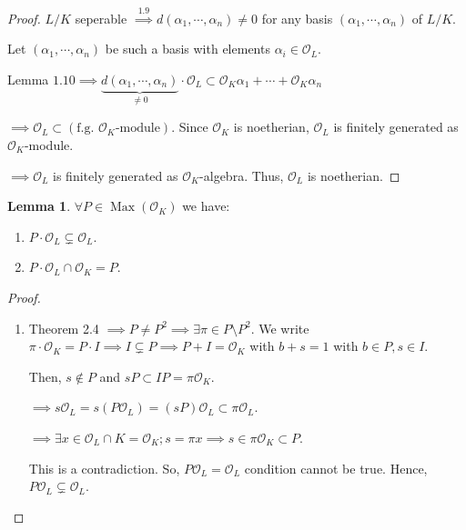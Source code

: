 \documentclass[openany]{amsbook}
\numberwithin{section}{chapter}
\theoremstyle{definition}
\newtheorem{lemma}[theorem]{Lemma}
\begin{document}
\begin{proof}
    \(L / K\) seperable \(\overset{1.9}{\implies}  d(\alpha_1, \cdots , \alpha_n) \neq 0\) for any basis \((\alpha_1, \cdots , \alpha_n)\) of \(L / K\). 

    Let \((\alpha_1, \cdots , \alpha_n)\) be such a basis with elements \(\alpha_i \in \mathcal{O}_L\). 

    Lemma \(1.10 \implies \underbrace{d(\alpha_1, \cdots , \alpha_n) }_{\neq 0} \cdot \mathcal{O}_L \subset \mathcal{O}_K \alpha_1 + \cdots + \mathcal{O}_K \alpha_n\) 

    \(\implies \mathcal{O}_L \subset (\text{f.g. } \mathcal{O}_K \text{-module})\). Since \(\mathcal{O}_K\) is noetherian, \(\mathcal{O}_L\) is finitely generated as \(\mathcal{O}_K\)-module.

    \(\implies \mathcal{O}_L\) is finitely generated as \(\mathcal{O}_K\)-algebra. Thus, \(\mathcal{O}_L\) is noetherian.
\end{proof}

\begin{lemma}
    \(\forall P \in \operatorname{Max}(\mathcal{O}_K)\) we have:

    \begin{enumerate}[label=\roman*)]
        \item \(P \cdot \mathcal{O}_L \subsetneq \mathcal{O}_L\).
        \item \(P \cdot \mathcal{O}_L \cap \mathcal{O}_K = P\).   
    \end{enumerate}
\end{lemma}

\begin{proof}
    \begin{enumerate}[label=\roman*)]
        \item Theorem 2.4 \(\implies P \neq P^2 \implies \exists \pi \in P \setminus P^2\). We write \(\pi \cdot \mathcal{O}_K = P \cdot I \implies I \subsetneq P \implies P + I = \mathcal{O}_K\) with \(b+s = 1\) with \(b \in P, s \in I\).
        
        Then, \(s\notin P\) and \(sP \subset IP = \pi \mathcal{O}_K\). 
        
        \(\implies s \mathcal{O}_L = s (P \mathcal{O}_L) = (sP)\mathcal{O}_L \subset \pi\mathcal{O}_L\).

        \(\implies \exists x\in \mathcal{O}_L \cap K = \mathcal{O}_K; s = \pi x \implies s \in \pi \mathcal{O}_K \subset P\). 

        This is a contradiction. So, \(P \mathcal{O}_L = \mathcal{O}_L\) condition cannot be true. Hence, \(P\mathcal{O}_L \subsetneq \mathcal{O}_L\).
    \end{enumerate} 
\end{proof}
\end{document}

